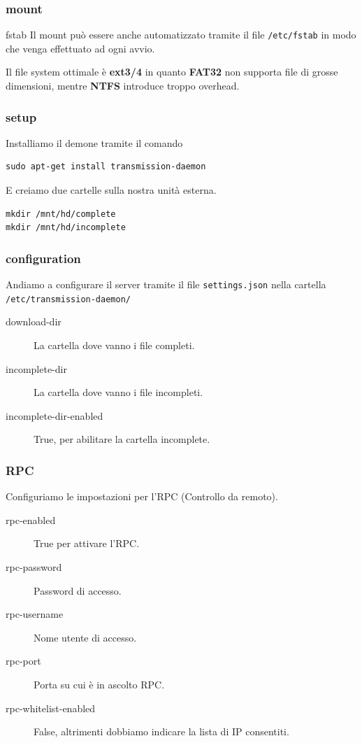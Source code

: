 \documentclass[xcolor=svgnames,11pt]{beamer}
\begin{document}
\begin{frame}\frametitle{mount}
\begin{block}{fstab}
Il mount pu\`o essere anche automatizzato tramite il file \texttt{/etc/fstab} in modo che venga effettuato ad ogni avvio.  
\end{block}

Il file system ottimale \`e \textbf{ext3/4} in quanto \textbf{FAT32} non supporta file di grosse dimensioni, mentre \textbf{NTFS} introduce troppo overhead.
\end{frame}

\begin{frame}[fragile]\frametitle{setup}
Installiamo il demone tramite il comando
\begin{verbatim}
sudo apt-get install transmission-daemon
\end{verbatim}
\medskip
E creiamo due cartelle sulla nostra unit\`a esterna.
\begin{verbatim}
mkdir /mnt/hd/complete
mkdir /mnt/hd/incomplete
\end{verbatim}
\end{frame}

\begin{frame}[fragile]\frametitle{configuration}
Andiamo a configurare il server tramite il file \texttt{settings.json} nella cartella \texttt{/etc/transmission-daemon/}
\medskip
\begin{small}
\begin{description}
  \item[download-dir] La cartella dove vanno i file completi.
  \item[incomplete-dir] La cartella dove vanno i file incompleti.
  \item[incomplete-dir-enabled] True, per abilitare la cartella incomplete.
\end{description}
\end{small}
\end{frame}

\begin{frame}[fragile]\frametitle{RPC}
Configuriamo le impostazioni per l'RPC (Controllo da remoto).
\medskip
\begin{small}
\begin{description}
  \item[rpc-enabled] True per attivare l'RPC.
  \item[rpc-password] Password di accesso.
  \item[rpc-username] Nome utente di accesso.
  \item[rpc-port] Porta su cui \`e in ascolto RPC.
  \item[rpc-whitelist-enabled] False, altrimenti dobbiamo indicare la lista di IP consentiti.
\end{description}
\end{small}
\end{frame}
\end{document}
